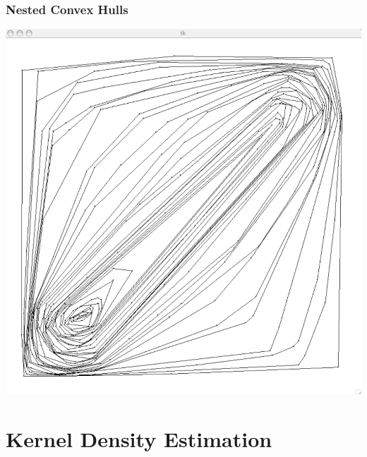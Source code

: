 \documentclass[nototal]{beamer}
\begin{document}
\begin{frame}
   \frametitle{Nested Convex Hulls}
   \begin{center}
     \includegraphics[width=.65\linewidth]{nestedHulls}
   \end{center}
 \end{frame}



\section{Kernel Density Estimation}
\end{document}
